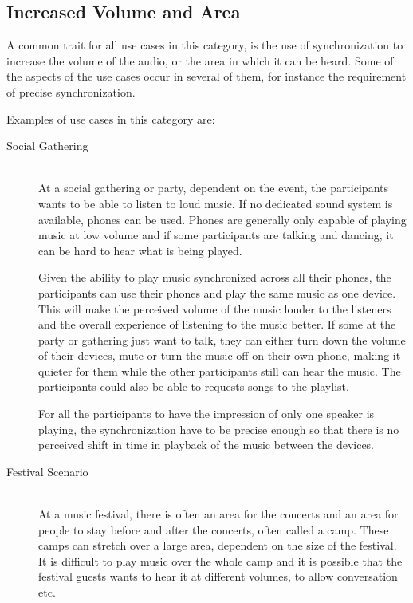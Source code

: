 \subsection{Increased Volume and Area}
A common trait for all use cases in this category, is the use of synchronization to increase the volume of the audio, or the area in which it can be heard.
Some of the aspects of the use cases occur in several of them, for instance the requirement of precise synchronization.

Examples of use cases in this category are:
\begin{description}
    \item[Social Gathering] \hfill\\
        At a social gathering or party, dependent on the event, the participants wants to be able to listen to loud music.
        If no dedicated sound system is available, phones can be used. 
        Phones are generally only capable of playing music at low volume and if some participants are talking and dancing, it can be hard to hear what is being played.

        Given the ability to play music synchronized across all their phones, the participants can use their phones and play the same music as one device.
        This will make the perceived volume of the music louder to the listeners and the overall experience of listening to the music better.
        If some at the party or gathering just want to talk, they can either turn down the volume of their devices, mute or turn the music off on their own phone,
        making it quieter for them while the other participants still can hear the music.
        The participants could also be able to requests songs to the playlist.

        For all the participants to have the impression of only one speaker is playing, 
        the synchronization have to be precise enough so that there is no perceived shift in time in playback of the music between the devices.

    \item[Festival Scenario] \hfill\\
        At a music festival, there is often an area for the concerts and an area for people to stay before and after the concerts, often called a camp.
        These camps can stretch over a large area, dependent on the size of the festival.
        It is difficult to play music over the whole camp and it is possible that the festival guests wants to hear it at different volumes, to allow conversation etc.


\end{description}
